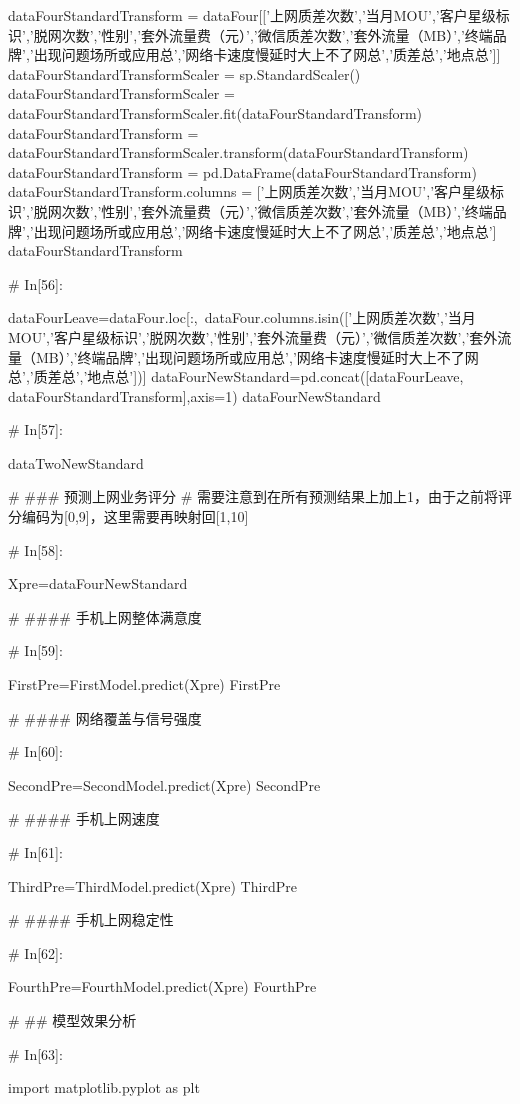\documentclass{MathorCupmodeling}
\begin{document}
\begin{python}
dataFourStandardTransform = dataFour[['上网质差次数','当月MOU','客户星级标识','脱网次数','性别','套外流量费（元）','微信质差次数','套外流量（MB）','终端品牌','出现问题场所或应用总','网络卡速度慢延时大上不了网总','质差总','地点总']]
dataFourStandardTransformScaler = sp.StandardScaler()
dataFourStandardTransformScaler = dataFourStandardTransformScaler.fit(dataFourStandardTransform)
dataFourStandardTransform = dataFourStandardTransformScaler.transform(dataFourStandardTransform)
dataFourStandardTransform = pd.DataFrame(dataFourStandardTransform)
dataFourStandardTransform.columns = ['上网质差次数','当月MOU','客户星级标识','脱网次数','性别','套外流量费（元）','微信质差次数','套外流量（MB）','终端品牌','出现问题场所或应用总','网络卡速度慢延时大上不了网总','质差总','地点总']
dataFourStandardTransform


# In[56]:


dataFourLeave=dataFour.loc[:,~dataFour.columns.isin(['上网质差次数','当月MOU','客户星级标识','脱网次数','性别','套外流量费（元）','微信质差次数','套外流量（MB）','终端品牌','出现问题场所或应用总','网络卡速度慢延时大上不了网总','质差总','地点总'])]
dataFourNewStandard=pd.concat([dataFourLeave, dataFourStandardTransform],axis=1)
dataFourNewStandard


# In[57]:


dataTwoNewStandard


# ### 预测上网业务评分
# 需要注意到在所有预测结果上加上1，由于之前将评分编码为[0,9]，这里需要再映射回[1,10]

# In[58]:


Xpre=dataFourNewStandard


# #### 手机上网整体满意度

# In[59]:


FirstPre=FirstModel.predict(Xpre)
FirstPre


# #### 网络覆盖与信号强度

# In[60]:


SecondPre=SecondModel.predict(Xpre)
SecondPre


# #### 手机上网速度

# In[61]:


ThirdPre=ThirdModel.predict(Xpre)
ThirdPre


# #### 手机上网稳定性

# In[62]:


FourthPre=FourthModel.predict(Xpre)
FourthPre


# ## 模型效果分析

# In[63]:


import matplotlib.pyplot as plt


\end{python}
\end{document}

